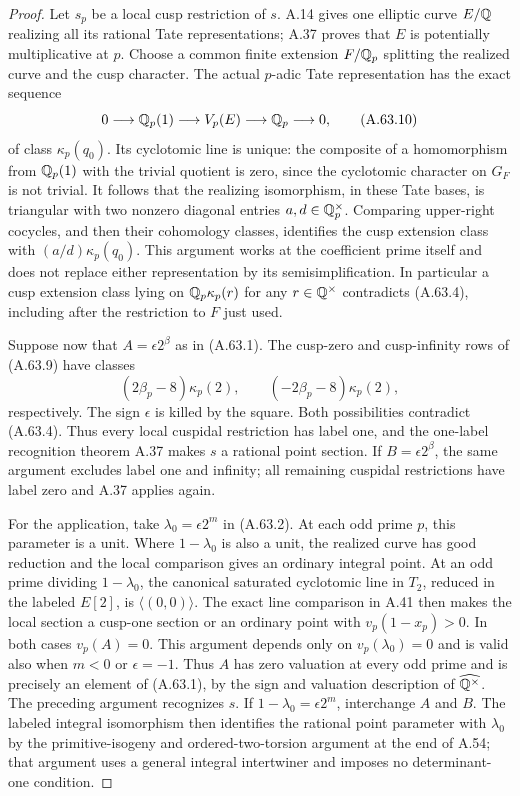 \begin{proof}
Let $s_p$ be a local cusp restriction of $s$.  A.14 gives
one elliptic curve $E/\mathbb Q$ realizing all its rational Tate
representations; A.37 proves that $E$ is potentially
multiplicative at $p$.  Choose a common finite extension
$F/\mathbb Q_p$ splitting the realized curve and the cusp character.
The actual $p$-adic Tate representation has the exact sequence
\[
       0\longrightarrow\mathbb Q_p(1)\longrightarrow V_p(E)
                       \longrightarrow\mathbb Q_p\longrightarrow0,
\tag{A.63.10}
\]
of class $\kappa_p(q_0)$.
Its cyclotomic line is unique: the composite of a homomorphism
from $\mathbb Q_p(1)$ with the trivial quotient is zero, since the
cyclotomic character on $G_F$ is not trivial.  It follows that
the realizing isomorphism, in these Tate bases, is triangular
with two nonzero diagonal entries $a,d\in\mathbb Q_p^\times$.
Comparing upper-right cocycles, and then their cohomology
classes, identifies the cusp extension class with
$(a/d)\kappa_p(q_0)$.
This argument works at the coefficient prime itself and
does not replace either representation by its semisimplification.
In particular a cusp extension class lying on
$\mathbb Q_p\kappa_p(r)$ for any $r\in\mathbb Q^\times$ contradicts
(A.63.4), including after the restriction to $F$ just used.

Suppose now that $A=\epsilon2^\beta$ as in (A.63.1).
The cusp-zero and cusp-infinity rows of (A.63.9) have classes
\[
        (2\beta_p-8)\kappa_p(2),\qquad
        (-2\beta_p-8)\kappa_p(2),
\tag{A.63.11}
\]
respectively.  The sign $\epsilon$ is killed by the square.
Both possibilities contradict (A.63.4).  Thus every local
cuspidal restriction has label one, and the one-label
recognition theorem A.37 makes $s$ a rational point section.
If $B=\epsilon2^\beta$, the same argument excludes label one
and infinity; all remaining cuspidal restrictions have label
zero and A.37 applies again.

For the application, take $\lambda_0=\epsilon2^m$ in (A.63.2).
At each odd prime $p$, this parameter is a unit.  Where
$1-\lambda_0$ is also a unit, the realized curve has good
reduction and the local comparison gives an ordinary integral
point.  At an odd prime dividing $1-\lambda_0$, the canonical
saturated cyclotomic line in $T_2$, reduced in the labeled
$E[2]$, is $\langle(0,0)\rangle$.  The exact line comparison
in A.41 then makes the local section a cusp-one section or
an ordinary point with $v_p(1-x_p)>0$.  In both cases
$v_p(A)=0$.  This argument depends only on
$v_p(\lambda_0)=0$ and is valid also when $m<0$ or
$\epsilon=-1$.  Thus $A$ has zero valuation at every odd
prime and is precisely an element of (A.63.1), by the sign
and valuation description of $\widehat{\mathbb Q^\times}$.
The preceding argument recognizes $s$.  If
$1-\lambda_0=\epsilon2^m$, interchange $A$ and $B$.
The labeled integral isomorphism then identifies the rational
point parameter with $\lambda_0$ by the primitive-isogeny
and ordered-two-torsion argument at the end of A.54; that
argument uses a general integral intertwiner and imposes
no determinant-one condition.


\end{proof}
